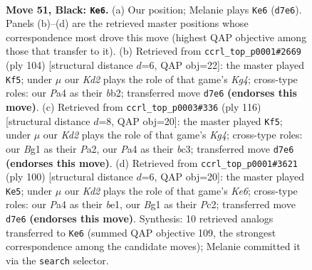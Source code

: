 \documentclass[11pt]{article}
\begin{document}
\clearpage

\begin{figure}[p]\centering
\begin{subfigure}{0.46\textwidth}\centering
\resizebox{\linewidth}{!}{%
\newchessgame
\chessboard[
  setfen={8/3k2K1/6p1/6P1/p7/3b4/8/6b1 b - - 9 51},
  showmover=false,
  pgfstyle=straightmove, color=movearrow, markmove={d7-e6}
]}
\caption{}
\end{subfigure}\hfill
\begin{subfigure}{0.46\textwidth}\centering
\resizebox{\linewidth}{!}{%
\newchessgame
\chessboard[
  setfen={8/8/3k4/3P4/p5K1/8/Bb6/8 w - - 1 53},
  showmover=false,
  pgfstyle=straightmove, color=movearrow, markmove={g4-f5}
]}
\caption{}
\end{subfigure}
\\[4pt]
\begin{subfigure}{0.46\textwidth}\centering
\resizebox{\linewidth}{!}{%
\newchessgame
\chessboard[
  setfen={8/8/3kP3/8/p1B3K1/2b5/P7/8 w - - 4 59},
  showmover=false,
  pgfstyle=straightmove, color=movearrow, markmove={g4-f5}
]}
\caption{}
\end{subfigure}\hfill
\begin{subfigure}{0.46\textwidth}\centering
\resizebox{\linewidth}{!}{%
\newchessgame
\chessboard[
  setfen={8/8/1Pk1K3/8/2pB4/8/2P5/4b3 w - - 3 51},
  showmover=false,
  pgfstyle=straightmove, color=movearrow, markmove={e6-e5}
]}
\caption{}
\end{subfigure}
\caption{\textbf{Move 51, Black: \texttt{Ke6}.} (a) Our position; Melanie plays \texttt{Ke6} (\texttt{d7e6}). Panels (b)--(d) are the retrieved master positions whose correspondence most drove this move (highest QAP objective among those that transfer to it). (b) Retrieved from \texttt{ccrl\_top\_p0001\#2669} (ply 104) [structural distance $d$=6, QAP obj=22]: the master played \texttt{Kf5}; under $\mu$ our \emph{Kd2} plays the role of that game's \emph{Kg4}; cross-type roles: our \emph{P}a4 as their \emph{b}b2; transferred move \texttt{d7e6} \textbf{(endorses this move)}. (c) Retrieved from \texttt{ccrl\_top\_p0003\#336} (ply 116) [structural distance $d$=8, QAP obj=20]: the master played \texttt{Kf5}; under $\mu$ our \emph{Kd2} plays the role of that game's \emph{Kg4}; cross-type roles: our \emph{B}g1 as their \emph{P}a2, our \emph{P}a4 as their \emph{b}c3; transferred move \texttt{d7e6} \textbf{(endorses this move)}. (d) Retrieved from \texttt{ccrl\_top\_p0001\#3621} (ply 100) [structural distance $d$=6, QAP obj=20]: the master played \texttt{Ke5}; under $\mu$ our \emph{Kd2} plays the role of that game's \emph{Ke6}; cross-type roles: our \emph{P}a4 as their \emph{b}e1, our \emph{B}g1 as their \emph{P}c2; transferred move \texttt{d7e6} \textbf{(endorses this move)}. Synthesis: 10 retrieved analogs transferred to \texttt{Ke6} (summed QAP objective 109, the strongest correspondence among the candidate moves); Melanie committed it via the \texttt{search} selector.}
\label{fig:thought-m101}
\end{figure}
\end{document}
